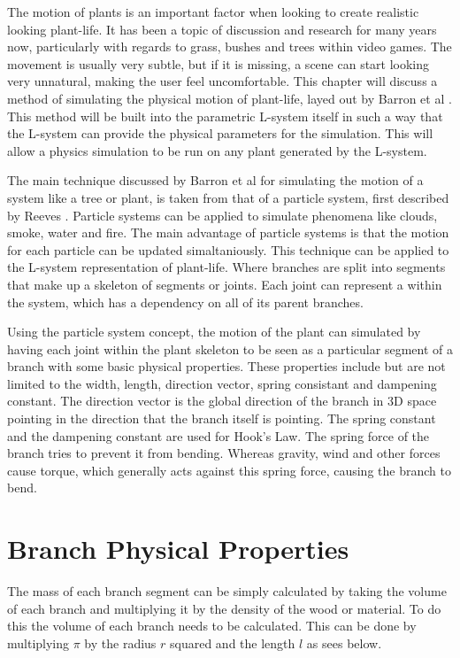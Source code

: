 

\lettrine[lines=3]{T}{}he motion of plants is an important factor when looking to create realistic looking plant-life. It has been a topic of discussion and research for many years now, particularly with regards to grass, bushes and trees within video games. The movement is usually very subtle, but if it is missing, a scene can start looking very unnatural, making the user feel uncomfortable. This chapter will discuss a method of simulating the physical motion of plant-life, layed out by Barron et al \cite{barron2001real}. This method will be built into the parametric L-system itself in such a way that the L-system can provide the physical parameters for the simulation. This will allow a physics simulation to be run on any plant generated by the L-system.

The main technique discussed by Barron et al for simulating the motion of a system like a tree or plant, is taken from that of a particle system, first described by Reeves \cite{reeves1983particle}. Particle systems can be applied to simulate phenomena like clouds, smoke, water and fire. The main advantage of particle systems is that the motion for each particle can be updated simaltaniously. This technique can be applied to the L-system representation of plant-life. Where branches are split into segments that make up a skeleton of segments or joints. Each joint can represent a  within the system, which has a dependency on all of its parent branches.

Using the particle system concept, the motion of the plant can simulated by having each joint within the plant skeleton to be seen as a particular segment of a branch with some basic physical properties. These properties include but are not limited to the width, length, direction vector, spring consistant and dampening constant. The direction vector is the global direction of the branch in 3D space pointing in the direction that the branch itself is pointing. The spring constant and the dampening constant are used for Hook's Law. The spring force of the branch tries to prevent it from bending. Whereas gravity, wind and other forces cause torque, which generally acts against this spring force, causing the branch to bend.

\section{Branch Physical Properties}

The mass of each branch segment can be simply calculated by taking the volume of each branch and multiplying it by the density of the wood or material. To do this the volume of each branch needs to be calculated. This can be done by multiplying $\pi$ by the radius $r$ squared and the length $l$ as sees below.

